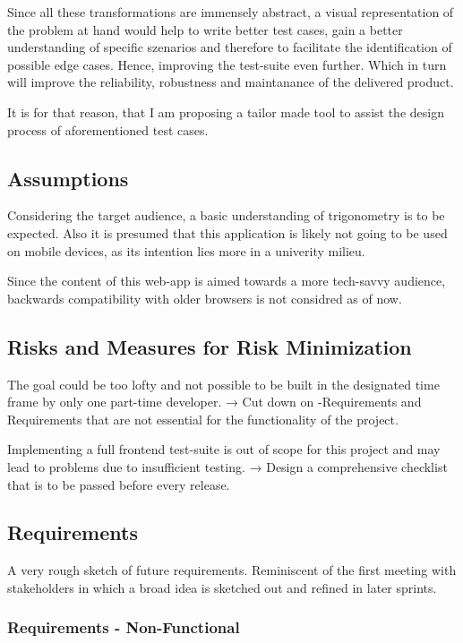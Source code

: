 Since all these transformations are immensely abstract, a visual representation of the problem at hand would help to write better test cases, gain a better understanding of specific szenarios and therefore to facilitate the identification of possible edge cases. Hence, improving the test-suite even further. Which in turn will improve the reliability, robustness and maintanance of the delivered product.

It is for that reason, that I am proposing a tailor made tool to assist the design process of aforementioned test cases.

\subsection{Assumptions}
Considering the target audience, a basic understanding of trigonometry is to be expected. Also it is  presumed that this application is likely not going to be used on mobile devices, as its intention lies more in a univerity milieu.

Since the content of this web-app is aimed towards a more tech-savvy audience, backwards compatibility with older browsers is not considred as of now.

\subsection{Risks and Measures for Risk Minimization}
The goal could be too lofty and not possible to be built in the designated time frame by only one part-time developer. → Cut down on 
-Requirements and Requirements that are not essential for the functionality of the project.

Implementing a full frontend test-suite is out of scope for this project and may lead to problems due to insufficient testing. → Design a comprehensive checklist that is to be passed before every release.

\subsection{Requirements}
A very rough sketch of future requirements. Reminiscent of the first meeting with stakeholders in which a broad idea is sketched out and refined in later sprints.
\subsubsection{Requirements - Non-Functional}


